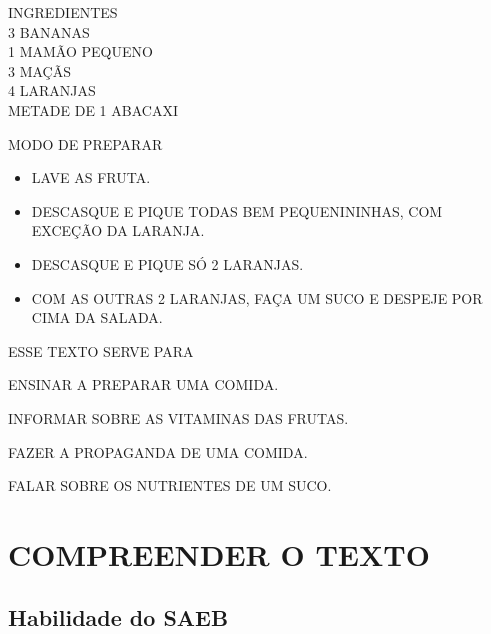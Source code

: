 INGREDIENTES\\
3 BANANAS\\
1 MAMÃO PEQUENO\\
3 MAÇÃS\\
4 LARANJAS\\
METADE DE 1 ABACAXI\medskip

MODO DE PREPARAR

\begin{itemize}
\item
  LAVE AS FRUTA.
\item
  DESCASQUE E PIQUE TODAS BEM PEQUENININHAS, COM EXCEÇÃO DA LARANJA.
\item
  DESCASQUE E PIQUE SÓ 2 LARANJAS.
\item
  COM AS OUTRAS 2 LARANJAS, FAÇA UM SUCO E DESPEJE POR CIMA DA SALADA.
\end{itemize}



ESSE TEXTO SERVE PARA

\begin{escolha}
\item ENSINAR A PREPARAR UMA COMIDA.

\item INFORMAR SOBRE AS VITAMINAS DAS FRUTAS.

\item FAZER A PROPAGANDA DE UMA COMIDA.

\item FALAR SOBRE OS NUTRIENTES DE UM SUCO.
\end{escolha}

\chapter{COMPREENDER O TEXTO}

\enlargethispage{2\baselineskip}

\section*{Habilidade do SAEB}


